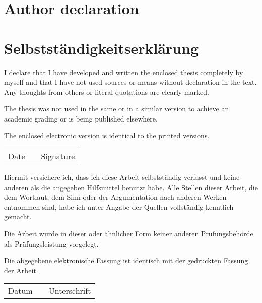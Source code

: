 \cleardoublepage
\ifenglish
\chapter*{Author declaration}
\else
\chapter*{Selbstständigkeitserklärung}
\fi

\thispagestyle{empty}
\ifenglish
I declare that I have developed and written the enclosed thesis completely by myself and that I have not used sources or means without declaration in the text. Any thoughts from others or literal quotations are clearly marked.

The thesis was not used in the same or in a similar version to achieve an academic grading or is being published elsewhere.

The enclosed electronic version is identical to the printed versions.

\vspace*{3cm}
\begin{tabular}{ccc}
\cline{1-1} \cline{3-3} 
Date\hspace*{3cm} & \hspace*{1cm} & Signature\hspace*{5cm}\tabularnewline
\end{tabular}
\else
Hiermit versichere ich, dass ich diese Arbeit selbstständig verfasst und keine anderen als
die angegeben Hilfsmittel benutzt habe. Alle Stellen dieser Arbeit, die dem Wortlaut, dem Sinn oder der Argumentation nach anderen Werken entnommen sind, habe ich unter Angabe der Quellen vollständig kenntlich gemacht.

Die Arbeit wurde in dieser oder ähnlicher Form keiner anderen Prüfungsbehörde als Prüfungsleistung vorgelegt.

Die abgegebene elektronische Fassung ist identisch mit der gedruckten Fassung der Arbeit.

\vspace*{3cm}
\begin{tabular}{ccc}
\cline{1-1} \cline{3-3} 
Datum\hspace*{3cm} & \hspace*{1cm} & Unterschrift\hspace*{5cm}\tabularnewline
\end{tabular}
\fi


\cleardoublepage

